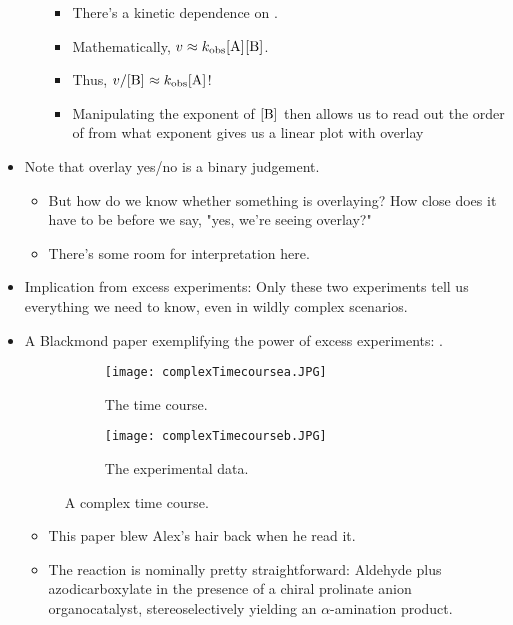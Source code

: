 \documentclass[../notes.tex]{subfiles}
\begin{document}
\begin{itemize}
\begin{itemize}
        \begin{itemize}
            \item There's a kinetic dependence on .
            \item Mathematically, $v\approx\kobs\cnc{A}\cnc{B}$.
            \item Thus, $v/\cnc{B}\approx\kobs\cnc{A}$!
            \item Manipulating the exponent of $\cnc{B}$ then allows us to read out the order of  from what exponent gives us a linear plot with overlay
        \end{itemize}
    \end{itemize}
    \item Note that overlay yes/no is a binary judgement.
    \begin{itemize}
        \item But how do we know whether something is overlaying? How close does it have to be before we say, "yes, we're seeing overlay?"
        \item There's some room for interpretation here.
    \end{itemize}
    \item Implication from excess experiments: Only these two experiments tell us everything we need to know, even in wildly complex scenarios.
    \item A Blackmond paper exemplifying the power of excess experiments: \textcite{bib:complexTimecourse}.
    \begin{figure}[h!]
        \centering
        \begin{subfigure}[b]{0.4\linewidth}
            \centering
            \texttt{[image: complexTimecoursea.JPG]}
            \caption{The time course.}
            \label{fig:complexTimecoursea}
        \end{subfigure}
        \begin{subfigure}[b]{0.4\linewidth}
            \centering
            \texttt{[image: complexTimecourseb.JPG]}
            \caption{The experimental data.}
            \label{fig:complexTimecourseb}
        \end{subfigure}
        \caption{A complex time course.}
        \label{fig:complexTimecourse}
    \end{figure}
    \begin{itemize}
        \item This paper blew Alex's hair back when he read it.
        \item The reaction is nominally pretty straightforward: Aldehyde plus azodicarboxylate in the presence of a chiral prolinate anion organocatalyst, stereoselectively yielding an $\alpha$-amination product.

\end{itemize}
\end{itemize}
\end{document}

